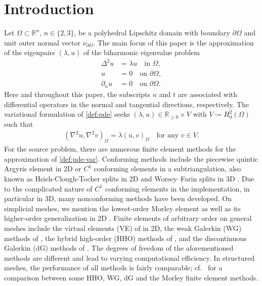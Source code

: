 \documentclass[a4paper]{amsart}
\numberwithin{equation}{section}
\theoremstyle{definition}
\theoremstyle{remark}
\numberwithin{theorem}{section}
\numberwithin{equation}{section}
\numberwithin{table}{section}
\numberwithin{figure}{section}
\begin{document}
\section{Introduction}
Let $\Omega \subset \mathbb{R}^n$, $n \in \{2,3\}$, be a polyhedral Lipschitz domain with boundary $\partial \Omega$ and unit outer normal vector $\nu_{\partial \Omega}$. 
The main focus of this paper is the approximation of the eigenpairs $(\lambda,u)$ of the biharmonic eigenvalue problem
\begin{equation}\label{def:pde}
    \begin{aligned}
        \Delta^2 u &= \lambda u \quad\text{in }\Omega,\\
        u &= 0 \quad\text{on }\partial\Omega,\\
        \partial_n u &= 0 \quad\text{on }\partial\Omega.
    \end{aligned}
\end{equation}
Here and throughout this paper, the subscripts $n$ and $t$ are associated with differential operators in the normal and tangential directions, respectively. The variational formulation of \eqref{def:pde} seeks $(\lambda,u) \in \mathbb{R}_{\geq 0} \times V$ with $V \coloneqq  H^2_0(\Omega)$ such that
\begin{align}\label{def:pde-var}
    (\nabla^2 u, \nabla^2 v)_\Omega = \lambda(u,v)_\Omega \quad\text{for any } v \in V.
\end{align}
For the source problem, there are numerous finite element methods for the approximation of \eqref{def:pde-var}. Conforming methods include the piecewise quintic Argyris element in 2D \cite{ArgyrisFriedScharpf1968} or $C^1$ conforming elements in a subtriangulation, also known as Hsieh-Clough-Tocher splits in 2D \cite{Ciarlet2002,GuzmanLischkeNeilan2022} and Worsey–Farin splits in 3D \cite{WorseyFarin1987,GuzmanLischkeNeilan2022}. Due to the complicated nature of $C^1$ conforming elements in the implementation, in particular in 3D, many nonconforming methods have been developed. On simplicial meshes, we mention the lowest-order Morley element \cite{Morley1968} as well as its higher-order generalization in 2D \cite{BlumRannacher1990}. 
Finite elements of arbitrary order on general meshes include the virtual elements (VE) of \cite{BrezziMarini2013,ZhaoChenZhang2016,AntoniettiManziniVerani2018} in 2D, the weak Galerkin (WG) methods of \cite{MuWangYe2014,ZhangZhai2015}, the hybrid high-order (HHO) methods of \cite{BonaldiDiPietroGeymonat2018,DongErn2022,DongErn2024}, and the discontinuous Galerkin (dG) methods of \cite{MozolevskiSuli2003,GeorgoulisHouston2009}.
The degrees of freedom of the aforementioned methods are different and lead to varying computational efficiency. In structured meshes, the performance of all methods is fairly comparable; cf.~\cite{DongErn2022} for a comparison between some HHO, WG, dG and the Morley finite element methods.
\end{document}
